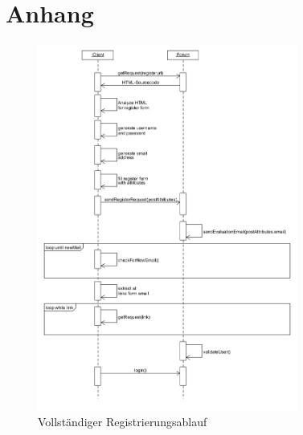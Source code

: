   	\newpage
   	\section{Anhang}
   	
   	\begin{figure}[ht]
   		\centering
		\includegraphics[width=0.76\textwidth,height=\textheight,keepaspectratio]{./diagrams/register_seq.png}
		\caption{Vollständiger Registrierungsablauf}
	\end{figure}
	\newpage
